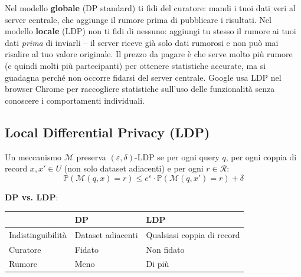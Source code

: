 \documentclass[a4paper,11pt]{article}
\begin{document}
\begin{nota}
Nel modello \textbf{globale} (DP standard) ti fidi del curatore: mandi i tuoi dati veri al server centrale, che aggiunge il rumore prima di pubblicare i risultati. Nel modello \textbf{locale} (LDP) non ti fidi di nessuno: aggiungi tu stesso il rumore ai tuoi dati \emph{prima} di inviarli -- il server riceve già solo dati rumorosi e non può mai risalire al tuo valore originale. Il prezzo da pagare è che serve molto più rumore (e quindi molti più partecipanti) per ottenere statistiche accurate, ma si guadagna perché non occorre fidarsi del server centrale. Google usa LDP nel browser Chrome per raccogliere statistiche sull'uso delle funzionalità senza conoscere i comportamenti individuali.
\end{nota}

\subsection{Local Differential Privacy (LDP)}

\begin{definizione}
Un meccanismo $\mathcal{M}$ preserva $(\varepsilon, \delta)$-LDP se per ogni query $q$, per ogni coppia di record $x, x' \in U$ (non solo dataset adiacenti) e per ogni $r \in \mathcal{R}$:
\[
\mathbb{P}(\mathcal{M}(q, x) = r) \leq e^{\varepsilon} \cdot \mathbb{P}(\mathcal{M}(q, x') = r) + \delta
\]
\end{definizione}

\textbf{DP vs. LDP}:
\begin{center}
\begin{tabular}{lll}
\toprule
 & \textbf{DP} & \textbf{LDP} \\
\midrule
Indistinguibilit\`{a} & Dataset adiacenti & Qualsiasi coppia di record \\
Curatore & Fidato & Non fidato \\
Rumore & Meno & Di pi\`{u} \\
\bottomrule
\end{tabular}
\end{center}
\end{document}
